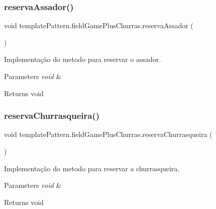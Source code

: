 \subsubsection{\texorpdfstring{reservaAssador()}{reservaAssador()}}
{\footnotesize\ttfamily void template\+Pattern.\+field\+Game\+Plus\+Churras.\+reserva\+Assador (\begin{DoxyParamCaption}{ }\end{DoxyParamCaption})}



Implementação do metodo para reservar o assador. 


\begin{DoxyParams}{Parameters}
{\em void} & \\
\hline
\end{DoxyParams}
\begin{DoxyReturn}{Returns}
void 
\end{DoxyReturn}
\mbox{\label{classtemplate_pattern_1_1field_game_plus_churras_abdc963849581d091a62fc1f3c7bbcc05}} 
\subsubsection{\texorpdfstring{reservaChurrasqueira()}{reservaChurrasqueira()}}
{\footnotesize\ttfamily void template\+Pattern.\+field\+Game\+Plus\+Churras.\+reserva\+Churrasqueira (\begin{DoxyParamCaption}{ }\end{DoxyParamCaption})}



Implementação do metodo para reservar a churrasqueira. 


\begin{DoxyParams}{Parameters}
{\em void} & \\
\hline
\end{DoxyParams}
\begin{DoxyReturn}{Returns}
void 
\end{DoxyReturn}
\mbox{\label{classtemplate_pattern_1_1field_game_plus_churras_a1f690b914e82f6d2de0182547dd82667}} 
